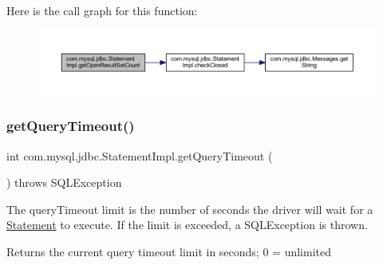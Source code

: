 Here is the call graph for this function\+:
\nopagebreak
\begin{figure}[H]
\begin{center}
\leavevmode
\includegraphics[width=350pt]{classcom_1_1mysql_1_1jdbc_1_1_statement_impl_ab14de7277504c8cd025b3af5a367beba_cgraph}
\end{center}
\end{figure}
\mbox{\label{classcom_1_1mysql_1_1jdbc_1_1_statement_impl_a7d917d5836a60a1e330f8c0674f551de}} 
\subsubsection{\texorpdfstring{get\+Query\+Timeout()}{getQueryTimeout()}}
{\footnotesize\ttfamily int com.\+mysql.\+jdbc.\+Statement\+Impl.\+get\+Query\+Timeout (\begin{DoxyParamCaption}{ }\end{DoxyParamCaption}) throws S\+Q\+L\+Exception}

The query\+Timeout limit is the number of seconds the driver will wait for a \mbox{\hyperlink{interfacecom_1_1mysql_1_1jdbc_1_1_statement}{Statement}} to execute. If the limit is exceeded, a S\+Q\+L\+Exception is thrown.

\begin{DoxyReturn}{Returns}
the current query timeout limit in seconds; 0 = unlimited
\end{DoxyReturn}

